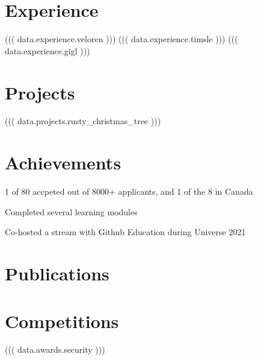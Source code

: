 \documentclass[]{deedy-resume-openfont}
\begin{document}
\begin{minipage}[t]{0.66\textwidth}


\section{Experience}

((( data.experience.veloren )))
((( data.experience.timsle )))
((( data.experience.gigl )))

\section{Projects}

((( data.projects.rusty_christmas_tree )))

\section{Achievements}

\begin{tightemize}
\item 1 of 80 accpeted out of 8000+ applicants, and 1 of the 8 in Canada
\item Completed several learning modules
\item Co-hosted a stream with Github Education during Universe 2021
\end{tightemize}
\sectionsep


\section{Publications} 
\renewcommand\refname{\vskip -1.5em} %


\nocite{*}

\section{Competitions}

((( data.awards.security )))

\end{minipage} 
\end{document}

